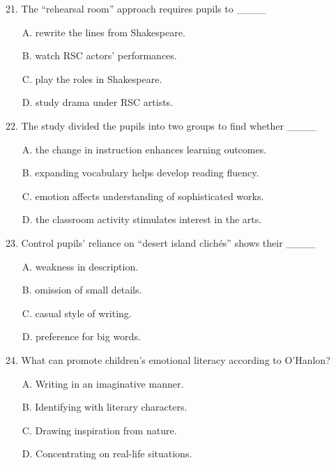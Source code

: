 \documentclass[UTF8,11pt]{ctexart}
\begin{document}
21. The “rehearsal room” approach requires pupils to \_\_\_\_


\begin{itemize}[leftmargin=2em,itemsep=.2em,topsep=.4em]\item[A.] rewrite the lines from Shakespeare.
\item[B.] watch RSC actors’ performances.
\item[C.] play the roles in Shakespeare.
\item[D.] study drama under RSC artists.
\end{itemize}

22. The study divided the pupils into two groups to find whether \_\_\_\_


\begin{itemize}[leftmargin=2em,itemsep=.2em,topsep=.4em]\item[A.] the change in instruction enhances learning outcomes.
\item[B.] expanding vocabulary helps develop reading fluency.
\item[C.] emotion affects understanding of sophisticated works.
\item[D.] the classroom activity stimulates interest in the arts.
\end{itemize}

23. Control pupils’ reliance on “desert island clichés” shows their \_\_\_\_


\begin{itemize}[leftmargin=2em,itemsep=.2em,topsep=.4em]\item[A.] weakness in description.
\item[B.] omission of small details.
\item[C.] casual style of writing.
\item[D.] preference for big words.
\end{itemize}

24. What can promote children’s emotional literacy according to O’Hanlon?


\begin{itemize}[leftmargin=2em,itemsep=.2em,topsep=.4em]\item[A.] Writing in an imaginative manner.
\item[B.] Identifying with literary characters.
\item[C.] Drawing inspiration from nature.
\item[D.] Concentrating on real-life situations.
\end{itemize}
\end{document}
